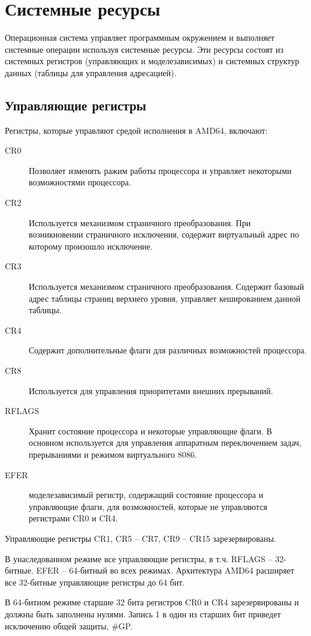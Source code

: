 \section{Системные ресурсы}
Операционная система управляет программным окружением и выполняет системные операции используя системные ресурсы.
Эти ресурсы состоят из системных регистров (управляющих и моделезависимых)
и системных структур данных (таблицы для управления адресацией).

\subsection*{Управляющие регистры}
Регистры, которые управляют средой исполнения в AMD64, включают:
\begin{description}
	\item[CR0] Позволяет изменять ражим работы процессора и управляет некоторыми возможностями процессора.
	\item[CR2] Используется механизмом страничного преобразования. При возникновении страничного исключения, содержит
		виртуальный адрес по которому произошло исключение.
	\item[CR3] Используется механизмом страничного преобразования. Содержит базовый адрес таблицы страниц верхнего
		уровня, управляет кешированием данной таблицы.
	\item[CR4] Содержит дополнительные флаги для различных возможностей процессора.
	\item[CR8] Используется для управления приоритетами внешних прерываний.
	\item[RFLAGS] Хранит состояние процессора и некоторые управляющие флаги. В основном используется для
		управления аппаратным переключением задач, прерываниями и режимом виртуального 8086.
	\item[EFER] моделезависимый регистр, содержащий состояние процессора и управляющие флаги, для
		возможностей, которые не управляются регистрами CR0 и CR4.
\end{description}

Управляющие регистры CR1, CR5 -- CR7, CR9 -- CR15 зарезервированы.

В унаследованном режиме все управляющие регистры, в т.ч. RFLAGS -- 32-битные. EFER -- 64-битный во всех режимах.
Архитектура AMD64 расширяет все 32-битные управляющие регистры до 64 бит.

В 64-битном режиме старшие 32 бита регистров CR0 и CR4 зарезервированы и должны быть заполнены нулями.
Запись 1 в один из старших бит приведет исключению общей защиты, \#GP.

